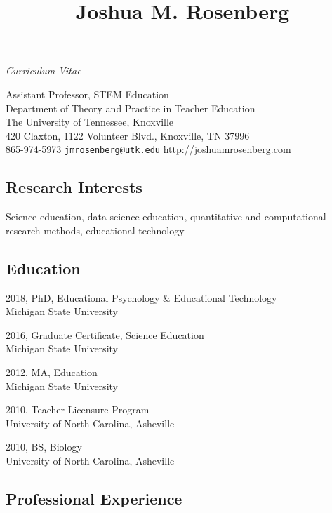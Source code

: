 \documentclass[14,]{article}
\title{Joshua M. Rosenberg}
\author{}
\date{}
\begin{document}
\maketitle

\begin{center}
\textit{Curriculum Vitae}
\end{center}

\begingroup
\center

Assistant Professor, STEM Education\\
Department of Theory and Practice in Teacher Education\\
The University of Tennessee, Knoxville\\
420 Claxton, 1122 Volunteer Blvd., Knoxville, TN 37996\\
865-974-5973 \textbar{}
\href{mailto:jmrosenberg@utk.edu}{\nolinkurl{jmrosenberg@utk.edu}}
\textbar{} \url{http://joshuamrosenberg.com}\\
\endgroup

\hypertarget{research-interests}{%
\subsection{Research Interests}\label{research-interests}}

Science education, data science education, quantitative and
computational research methods, educational technology

\hypertarget{education}{%
\subsection{Education}\label{education}}

2018, PhD, Educational Psychology \& Educational Technology\\
Michigan State University

2016, Graduate Certificate, Science Education\\
Michigan State University

2012, MA, Education\\
Michigan State University

2010, Teacher Licensure Program\\
University of North Carolina, Asheville

2010, BS, Biology\\
University of North Carolina, Asheville

\hypertarget{professional-experience}{%
\subsection{Professional Experience}\label{professional-experience}}
\end{document}
